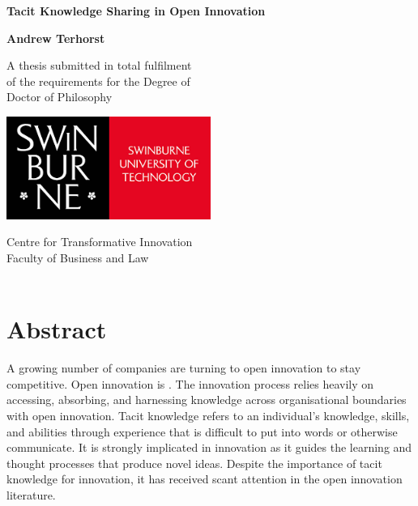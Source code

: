 \documentclass[12pt,table,xcdraw]{book}
\renewcommand{\today}{\the\day \ \monthname \ \the\year}
\begin{document}
\frontmatter

\begin{titlepage}
\renewcommand{\today}{\monthname \ \the\year}
\begin{center}
\vspace*{1cm}

\Huge
\textbf{Tacit Knowledge Sharing in Open Innovation}\\
\vspace{1cm}

\Large
\textbf{Andrew Terhorst}
\vfill

\Large
A thesis submitted in total fulfilment\\
of the requirements for the Degree of \\
Doctor of Philosophy

\vspace{1cm}

\includegraphics[width=0.5\textwidth]{Images/swinburne_university_of_technology.png} 

\vspace{1cm}

\Large
Centre for Transformative Innovation\\
Faculty of Business and Law\\
\today
\end{center}
\end{titlepage}

\doublespacing

\chapter*{Abstract}

A growing number of companies are turning to open innovation to stay competitive. Open innovation is   \citep{chesbrough2014explicating}. The innovation process relies heavily on accessing, absorbing, and harnessing knowledge across organisational boundaries with open innovation. Tacit knowledge refers to an individual's knowledge, skills, and abilities through experience that is difficult to put into words or otherwise communicate. It is strongly implicated in innovation as it guides the learning and thought processes that produce novel ideas. Despite the importance of tacit knowledge for innovation, it has received scant attention in the open innovation literature. \medskip
\end{document}
